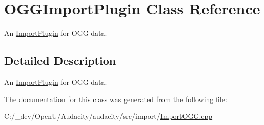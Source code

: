 \hypertarget{class_o_g_g_import_plugin}{}\section{O\+G\+G\+Import\+Plugin Class Reference}
\label{class_o_g_g_import_plugin}


An \hyperlink{class_import_plugin}{Import\+Plugin} for O\+GG data.  




\subsection{Detailed Description}
An \hyperlink{class_import_plugin}{Import\+Plugin} for O\+GG data. 

The documentation for this class was generated from the following file\+:\begin{DoxyCompactItemize}
\item 
C\+:/\+\_\+dev/\+Open\+U/\+Audacity/audacity/src/import/\hyperlink{_import_o_g_g_8cpp}{Import\+O\+G\+G.\+cpp}\end{DoxyCompactItemize}

